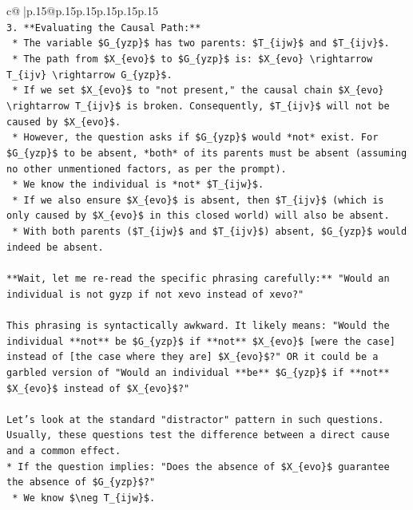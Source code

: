 \documentclass{article}
\begin{document}
{\begin{supertabular}{c@{$\;$}|p{.15\linewidth}@{}p{.15\linewidth}p{.15\linewidth}p{.15\linewidth}p{.15\linewidth}p{.15\linewidth}}
{{{\\ 
\texttt{3.  **Evaluating the Causal Path:**} \\
\texttt{    *   The variable \$G\_\{yzp\}\$ has two parents: \$T\_\{ijw\}\$ and \$T\_\{ijv\}\$.} \\
\texttt{    *   The path from \$X\_\{evo\}\$ to \$G\_\{yzp\}\$ is: \$X\_\{evo\} \textbackslash{}rightarrow T\_\{ijv\} \textbackslash{}rightarrow G\_\{yzp\}\$.} \\
\texttt{    *   If we set \$X\_\{evo\}\$ to "not present," the causal chain \$X\_\{evo\} \textbackslash{}rightarrow T\_\{ijv\}\$ is broken. Consequently, \$T\_\{ijv\}\$ will not be caused by \$X\_\{evo\}\$.} \\
\texttt{    *   However, the question asks if \$G\_\{yzp\}\$ would *not* exist. For \$G\_\{yzp\}\$ to be absent, *both* of its parents must be absent (assuming no other unmentioned factors, as per the prompt).} \\
\texttt{    *   We know the individual is *not* \$T\_\{ijw\}\$.} \\
\texttt{    *   If we also ensure \$X\_\{evo\}\$ is absent, then \$T\_\{ijv\}\$ (which is only caused by \$X\_\{evo\}\$ in this closed world) will also be absent.} \\
\texttt{    *   With both parents (\$T\_\{ijw\}\$ and \$T\_\{ijv\}\$) absent, \$G\_\{yzp\}\$ would indeed be absent.} \\
\\ 
\texttt{**Wait, let me re{-}read the specific phrasing carefully:** "Would an individual is not gyzp if not xevo instead of xevo?"} \\
\\ 
\texttt{This phrasing is syntactically awkward. It likely means: "Would the individual **not** be \$G\_\{yzp\}\$ if **not** \$X\_\{evo\}\$ {[}were the case{]} instead of {[}the case where they are{]} \$X\_\{evo\}\$?" OR it could be a garbled version of "Would an individual **be** \$G\_\{yzp\}\$ if **not** \$X\_\{evo\}\$ instead of \$X\_\{evo\}\$?"} \\
\\ 
\texttt{Let's look at the standard "distractor" pattern in such questions. Usually, these questions test the difference between a direct cause and a common effect.} \\
\texttt{*   If the question implies: "Does the absence of \$X\_\{evo\}\$ guarantee the absence of \$G\_\{yzp\}\$?"} \\
\texttt{    *   We know \$\textbackslash{}neg T\_\{ijw\}\$.} \\
}}}
\end{supertabular}}
\end{document}
